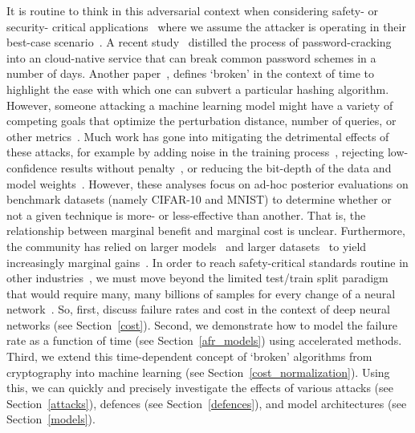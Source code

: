 It is routine to think in this adversarial context when considering safety- or security- critical applications~\cite{ai_medical_imaging,ai_security,ai_prison,ai_aviation,ai_luggage} where we assume the attacker is operating in their best-case scenario~\cite{leurent2020sha,kamal2017study,madry2017towards,pixelattack,deepfool,croce_reliable_2020}. A recent study~\cite{kamal2017study} distilled the process of password-cracking into an cloud-native service that can break common password schemes in a number of days. Another paper~\cite{leurent2020sha}, defines `broken' in the context of time to highlight the ease with which one can subvert a particular hashing algorithm. However, someone attacking a machine learning model might have a variety of competing goals that optimize the perturbation distance, number of queries, or other metrics~\cite{madry2017towards,hopskipjump,pixelattack,fgm,deepfool}. Much work has gone into mitigating the detrimental effects of these attacks, for example by adding noise in the training process~\cite{gauss_aug,gauss_out}, rejecting low-confidence results without penalty~\cite{high_conf}, or reducing the bit-depth of the data and model weights~\cite{feature_squeezing}. However, these analyses focus on ad-hoc posterior evaluations on benchmark datasets (namely CIFAR-10 and MNIST) to determine whether or not a given technique is more- or less-effective than another. That is, the relationship between marginal benefit and marginal cost is unclear. Furthermore, the community has  relied on larger models~\cite{desislavov2021compute} and larger datasets~\cite{desislavov2021compute,bailly2022effects} to yield increasingly marginal gains~\cite{sun2017revisiting}. In order to reach safety-critical standards routine in other industries~\cite{iso26262,IEC61508,IEC62034}, we must move beyond the limited test/train split paradigm that would require many, many billions of samples for every change of a neural network~\cite{meyers}. So, first, discuss failure rates and cost in the context of deep neural networks (see Section~\ref{cost}). Second, we demonstrate how to model the failure rate as a function of time (see Section~\ref{afr_models}) using accelerated methods. Third, we extend this time-dependent concept of `broken' algorithms from cryptography into machine learning (see Section~\ref{cost_normalization}). Using this, we can quickly and precisely investigate the effects of various attacks (see Section~\ref{attacks}), defences (see Section~\ref{defences}), and model architectures (see Section~\ref{models}).


